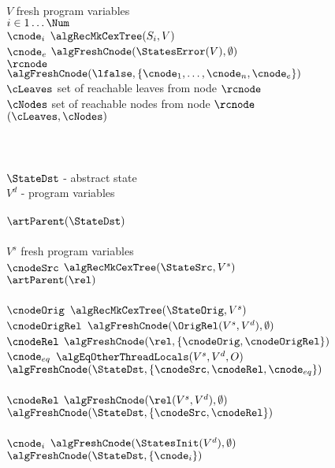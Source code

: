 \begin{figure}[t]
\begin{minipage}[t]{.94\columnwidth}
    \algBegin\\
    \tabT $V$ \algAssgn fresh program variables \\
    \tabT \algForeach $i \in 1\dots \Num$ \algDo\\
    \tabTT $\cnode_i$ \algAssgn $\algRecMkCexTree(S_i,V)$\\
    \tabT $\cnode_e$ \algAssgn $\algFreshCnode(\StatesError(V),\emptyset)$ \\
    \tabT $\rcnode$ \algAssgn $\algFreshCnode(\lfalse,\{\cnode_1,\dots,\cnode_n,\cnode_e\})$ \\
    \tabT $\cLeaves$ \algAssgn set of reachable leaves from node $\rcnode$ \\
    \tabT $\cNodes$  \algAssgn set of reachable nodes from node $\rcnode$ \\
    \tabT \algReturn  $(\cLeaves,\cNodes)$ \\
    \algEnd \\

    \algFunction \algRecMkCexTree\\
    \algInput \\
    \tabT $\StateDst$ - abstract state \\
    \tabT $V^{d}$ - program variables\\
    \algBegin\\
    \tabT \algMatch $\artParent(\StateDst)$ \algWith\\
    \tabT \algCase{$(\StateSrc,\rel)$} \\
    \tabTT $V^{s}$ \algAssgn fresh program variables\\
    \tabTT $\cnodeSrc$ \algAssgn $\algRecMkCexTree(\StateSrc,V^{s})$\\
    \tabTT \algMatch $\artParent(\rel)$ \algWith \\
    \tabTT \algCase{$(\StateOrig,\OrigRel)$} \\
    \tabTTTT $\cnodeOrig$ \algAssgn $\algRecMkCexTree(\StateOrig,V^{s})$ \\
    \tabTTTT $\cnodeOrigRel$ \algAssgn $\algFreshCnode(\OrigRel(V^{s},V^{d}), \emptyset)$ \\
    \tabTTTT $\cnodeRel$ \algAssgn $\algFreshCnode(\rel, \{\cnodeOrig,\cnodeOrigRel\})$ \\
    \tabTTTT $\cnode_{eq}$  \algAssgn $\algEqOtherThreadLocals(V^{s},V^{d},O)$ \\
    \tabTTTT \algReturn $\algFreshCnode(\StateDst,\{\cnodeSrc,\cnodeRel,\cnode_{eq}\})$ \\
    \tabTT \algCase{$\bot$} \\
    \tabTTTT $\cnodeRel$ \algAssgn $\algFreshCnode(\rel(V^{s},V^{d}),\emptyset)$ \\
    \tabTTTT \algReturn $\algFreshCnode(\StateDst,\{\cnodeSrc,\cnodeRel\})$ \\
    \tabT \algCase{$\bot$} \\
    \tabTT $\cnode_i$ \algAssgn $\algFreshCnode(\StatesInit(V^{d}),\emptyset)$ \\
    \tabTT \algReturn $\algFreshCnode(\StateDst,\{\cnode_i\})$ \\
    \algEnd \\


\end{minipage}
\end{figure}
